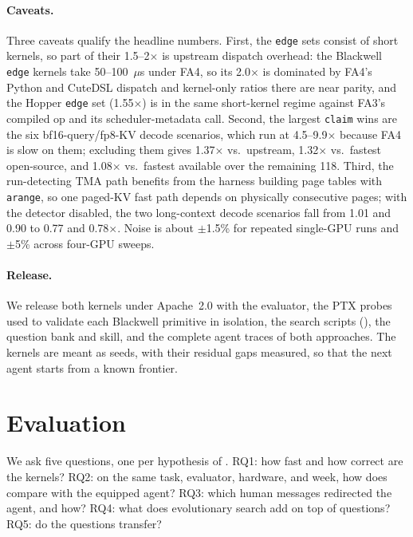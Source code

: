 \paragraph{Caveats.} Three caveats qualify the headline numbers. First, the \texttt{edge} sets
consist of short kernels, so part of their 1.5--2$\times$ is upstream dispatch overhead: the
Blackwell \texttt{edge} kernels take 50--100~$\mu$s under FA4, so its 2.0$\times$ is dominated by
FA4's Python and CuteDSL dispatch and kernel-only ratios there are near parity, and the Hopper
\texttt{edge} set (1.55$\times$) is in the same short-kernel regime against FA3's compiled op and
its scheduler-metadata call. Second, the largest \texttt{claim} wins are the six bf16-query/fp8-KV
decode scenarios, which run at 4.5--9.9$\times$ because FA4 is slow on them; excluding them gives
1.37$\times$ vs.\ upstream, 1.32$\times$ vs.\ fastest open-source, and 1.08$\times$ vs.\ fastest
available over the remaining 118. Third, the run-detecting TMA path benefits from the harness
building page tables with \texttt{arange}, so one paged-KV fast path depends on physically
consecutive pages; with the detector disabled, the two long-context decode scenarios fall from 1.01
and 0.90 to 0.77 and 0.78$\times$. Noise is about $\pm$1.5\% for repeated single-GPU runs and
$\pm$5\% across four-GPU sweeps.

\paragraph{Release.} We release both kernels under Apache~2.0 with the evaluator, the PTX probes used
to validate each Blackwell primitive in isolation, the search scripts (),
the question bank and skill, and the complete agent traces of both approaches. The kernels are meant as seeds, with their residual
gaps measured, so that the next agent starts from a known frontier.

\section{Evaluation}
\label{kernelseek:sec:eval}

We ask five questions, one per hypothesis of . RQ1: how fast and how correct
are the kernels? RQ2: on the same task, evaluator, hardware, and week, how does \KernelSeek compare with the
equipped agent? RQ3: which human messages redirected the agent, and how? RQ4: what does evolutionary
search add on top of questions? RQ5: do the questions transfer?

